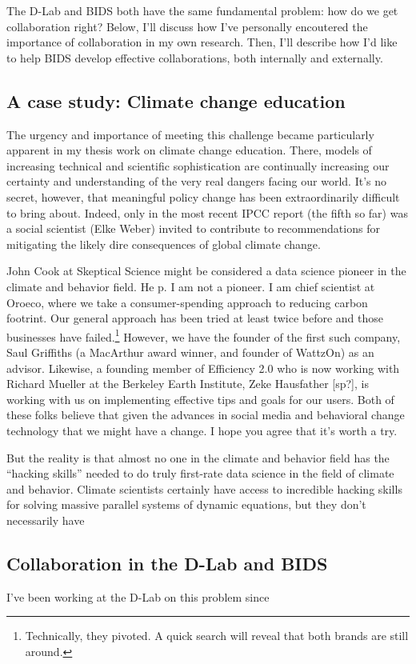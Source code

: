 \documentclass[12pt]{article}
\begin{document}
The D-Lab and BIDS both have the same fundamental problem: how do we get
collaboration right? Below, I'll discuss how I've personally encoutered the
importance of collaboration in my own research. Then, I'll describe how I'd like
to help BIDS develop effective collaborations, both internally and externally.

\subsection*{A case study: Climate change education}

The urgency and importance of meeting this challenge became
particularly apparent in my thesis work on climate change education. There,
models of increasing technical and scientific sophistication are continually
increasing our certainty and understanding of the very real dangers facing our
world. It's no secret, however, that meaningful policy change has been
extraordinarily difficult to bring about. Indeed, only in the most recent IPCC
report (the fifth so far) was a social scientist (Elke Weber) invited to
contribute to recommendations for mitigating the likely dire consequences of
global climate change.

John Cook at Skeptical Science might be considered a data science pioneer in the
climate and behavior field. He p. I am not a pioneer. I am chief scientist at
Oroeco, where we take a consumer-spending approach to reducing carbon footrint.
Our general approach has been tried at least twice before and those businesses
have failed.\footnote{Technically, they pivoted. A quick search will reveal that
both brands are still around.} However, we have the founder of the first
such company, Saul Griffiths (a MacArthur award winner, and founder of WattzOn)
as an advisor.  Likewise, a founding member of Efficiency 2.0 who is now working
with Richard Mueller at the Berkeley Earth Institute, Zeke Hausfather [sp?], is
working with us on implementing effective tips and goals for our users. Both of
these folks believe that given the advances in social media and behavioral
change technology that we might have a change. I hope you agree that it's worth
a try.

But the reality is that almost no one in the climate and behavior field has the
“hacking skills” needed to do truly first-rate data science in the field of
climate and behavior. Climate scientists certainly have access to incredible
hacking skills for solving massive parallel systems of dynamic equations, but
they don't necessarily have 

\subsection*{Collaboration in the D-Lab and BIDS}

I've been working at the D-Lab on this problem since 
\end{document}
